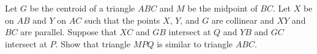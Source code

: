 Let $G$ be the centroid of a triangle $ABC$ and $M$ be the midpoint of $BC$. Let $X$ be on $AB$ and $Y$ on $AC$ such that the points $X$, $Y$, and $G$ are collinear and $XY$ and $BC$ are parallel. Suppose that $XC$ and $GB$ intersect at $Q$ and $YB$ and $GC$ intersect at $P$. Show that triangle $MPQ$ is similar to triangle $ABC$.